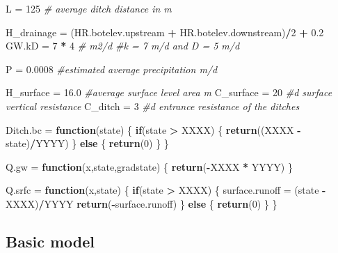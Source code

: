 \documentclass[
]{article}
\newenvironment{Shaded}{\begin{snugshade}}{\end{snugshade}}
\newcommand{\CommentTok}[1]{\textcolor[rgb]{0.56,0.35,0.01}{\textit{#1}}}
\newcommand{\ControlFlowTok}[1]{\textcolor[rgb]{0.13,0.29,0.53}{\textbf{#1}}}
\newcommand{\DecValTok}[1]{\textcolor[rgb]{0.00,0.00,0.81}{#1}}
\newcommand{\FloatTok}[1]{\textcolor[rgb]{0.00,0.00,0.81}{#1}}
\newcommand{\FunctionTok}[1]{\textcolor[rgb]{0.13,0.29,0.53}{\textbf{#1}}}
\newcommand{\NormalTok}[1]{#1}
\newcommand{\OtherTok}[1]{\textcolor[rgb]{0.56,0.35,0.01}{#1}}
\newcommand{\SpecialCharTok}[1]{\textcolor[rgb]{0.81,0.36,0.00}{\textbf{#1}}}
\begin{document}
\begin{Shaded}
\begin{Highlighting}[]
\NormalTok{L }\OtherTok{=} \DecValTok{125} \CommentTok{\# average ditch distance in m}

\NormalTok{H\_drainage }\OtherTok{=}\NormalTok{ (HR.botelev.upstream }\SpecialCharTok{+}\NormalTok{ HR.botelev.downstream)}\SpecialCharTok{/}\DecValTok{2} \SpecialCharTok{+} \FloatTok{0.2}
\NormalTok{GW.kD }\OtherTok{=} \DecValTok{7} \SpecialCharTok{*} \DecValTok{4} \CommentTok{\# m2/d \#k = 7 m/d and D = 5 m/d}

\NormalTok{P }\OtherTok{=} \FloatTok{0.0008} \CommentTok{\#estimated average precipitation m/d}

\NormalTok{H\_surface }\OtherTok{=} \FloatTok{16.0} \CommentTok{\#average surface level area m}
\NormalTok{C\_surface }\OtherTok{=} \DecValTok{20} \CommentTok{\#d surface vertical resistance}
\NormalTok{C\_ditch }\OtherTok{=} \DecValTok{3} \CommentTok{\#d entrance resistance of the ditches}

\NormalTok{Ditch.bc }\OtherTok{=} \ControlFlowTok{function}\NormalTok{(state)}
\NormalTok{\{}
  \ControlFlowTok{if}\NormalTok{(state }\SpecialCharTok{\textgreater{}}\NormalTok{ XXXX)}
\NormalTok{  \{}
  \FunctionTok{return}\NormalTok{((XXXX }\SpecialCharTok{{-}}\NormalTok{ state)}\SpecialCharTok{/}\NormalTok{YYYY)}
\NormalTok{  \}}
  \ControlFlowTok{else}
\NormalTok{  \{}
    \FunctionTok{return}\NormalTok{(}\DecValTok{0}\NormalTok{)}
\NormalTok{  \}}
\NormalTok{\}}

\NormalTok{Q.gw }\OtherTok{=} \ControlFlowTok{function}\NormalTok{(x,state,gradstate)}
\NormalTok{\{}
  \FunctionTok{return}\NormalTok{(}\SpecialCharTok{{-}}\NormalTok{XXXX }\SpecialCharTok{*}\NormalTok{ YYYY)}
\NormalTok{\}}

\NormalTok{Q.srfc }\OtherTok{=} \ControlFlowTok{function}\NormalTok{(x,state)}
\NormalTok{\{}
  \ControlFlowTok{if}\NormalTok{(state }\SpecialCharTok{\textgreater{}}\NormalTok{ XXXX) }
\NormalTok{  \{}
\NormalTok{  surface.runoff }\OtherTok{=}\NormalTok{ (state }\SpecialCharTok{{-}}\NormalTok{ XXXX)}\SpecialCharTok{/}\NormalTok{YYYY}
  \FunctionTok{return}\NormalTok{(}\SpecialCharTok{{-}}\NormalTok{surface.runoff)}
\NormalTok{  \}}
  \ControlFlowTok{else}
\NormalTok{  \{  }
    \FunctionTok{return}\NormalTok{(}\DecValTok{0}\NormalTok{)}
\NormalTok{  \}}
\NormalTok{\}}
\end{Highlighting}
\end{Shaded}

\hypertarget{basic-model}{%
\subsection{Basic model}\label{basic-model}}
\end{document}
